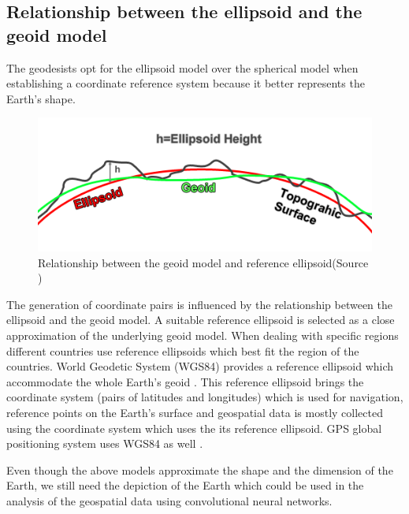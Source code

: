 \subsection{Relationship between the ellipsoid and the geoid model}
The geodesists opt for the ellipsoid model over the spherical model when establishing a coordinate reference system because it better represents the Earth's shape.

\begin{figure}[h]
    \centering
    \includegraphics[width=0.6\linewidth]{figures/chapter-2/Ellipsoid-height-relation.png}
    \caption{Relationship between the geoid model and reference ellipsoid(Source \cite{GISGEO_Ellipsoid}) }
    \label{fig:relationship-ellipsoid-geoid-image}
\end{figure}

The generation of coordinate pairs is influenced by the relationship between the ellipsoid and the geoid model. A suitable reference ellipsoid is selected as a close approximation of the underlying geoid model.
When dealing with specific regions different countries use reference ellipsoids which best fit the region of the countries.
World Geodetic System (WGS84) provides a reference ellipsoid which accommodate the whole Earth's geoid \cite{GISGEO_Ellipsoid}. This reference ellipsoid brings the coordinate system (pairs of latitudes and longitudes) which is used for navigation,
reference points on the Earth's surface and geospatial data is mostly collected using the coordinate system which uses the its reference ellipsoid.
GPS global positioning system uses WGS84 as well \cite{GISGEO_WGS84}.

Even though the above models approximate the shape and the dimension of the Earth, we still need the depiction of the Earth which could be used in the analysis of the geospatial
data using convolutional neural networks.